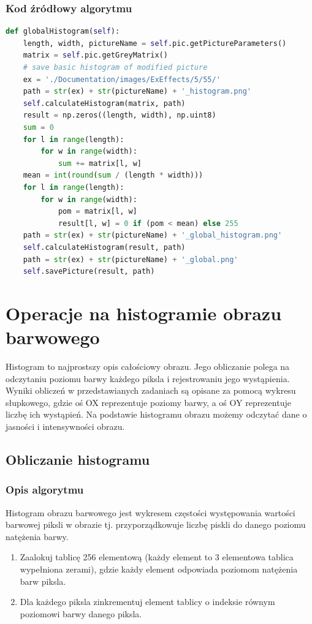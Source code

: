\documentclass[a4paper,12pt, titlepage]{report}
\begin{document}
\subsection*{Kod źródłowy algorytmu}
\begin{lstlisting}[language=Python]
def globalHistogram(self):
    length, width, pictureName = self.pic.getPictureParameters()
    matrix = self.pic.getGreyMatrix()
    # save basic histogram of modified picture
    ex = './Documentation/images/ExEffects/5/55/'
    path = str(ex) + str(pictureName) + '_histogram.png'
    self.calculateHistogram(matrix, path)
    result = np.zeros((length, width), np.uint8)
    sum = 0
    for l in range(length):
        for w in range(width):
            sum += matrix[l, w]
    mean = int(round(sum / (length * width)))
    for l in range(length):
        for w in range(width):
            pom = matrix[l, w]
            result[l, w] = 0 if (pom < mean) else 255
    path = str(ex) + str(pictureName) + '_global_histogram.png'
    self.calculateHistogram(result, path)
    path = str(ex) + str(pictureName) + '_global.png'
    self.savePicture(result, path)
\end{lstlisting}

\chapter{Operacje na histogramie obrazu barwowego}
\par Histogram to najprostszy opis całościowy obrazu. Jego obliczanie polega na odczytaniu poziomu barwy każdego piksla i rejestrowaniu jego wystąpienia. Wyniki obliczeń w przedstawianych zadaniach są opisane za pomocą wykresu słupkowego, gdzie oś OX reprezentuje poziomy barwy, a oś OY reprezentuje liczbę ich wystąpień. Na podstawie histogramu obrazu możemy odczytać dane o jasności i intensywności obrazu.

\section{Obliczanie histogramu}
\subsection*{Opis algorytmu}
\par Histogram obrazu barwowego jest wykresem częstości występowania wartości barwowej piksli w obrazie tj. przyporządkowuje liczbę piskli do danego poziomu natężenia barwy.
\begin{enumerate}
\item Zaalokuj tablicę 256 elementową (każdy element to 3 elementowa tablica wypełniona zerami), gdzie każdy element odpowiada poziomom natężenia barw piksla.
\item Dla każdego piksla zinkrementuj element tablicy o indeksie równym poziomowi barwy danego piksla.
\end{enumerate}
\end{document}
